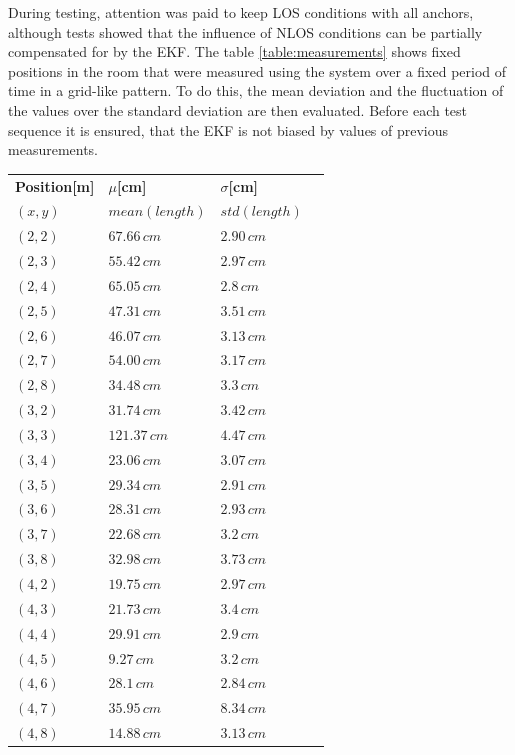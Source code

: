 \documentclass[conference, a4paper]{IEEEtran}
\begin{document}
During testing, attention was paid to keep \ac{LOS} conditions with all anchors,
although tests showed that the influence of \ac{NLOS} conditions can be partially compensated for by the \ac{EKF}.
The table \ref{table:measurements} shows fixed positions in the room that were measured using the system
over a fixed period of time in a grid-like pattern. 
To do this, the mean deviation and the fluctuation of the values over the standard deviation are then evaluated. 
Before each test sequence it is ensured, that the \ac{EKF} is not biased by values of previous measurements. 

\begin{table}[hbt!]
	\centering
	\begin{tabular}{l l l c}
		\textbf{Position[m]} & \textbf{$\mu$[cm]} & \textbf{$\sigma$[cm]}\\
		$(x,y)$ & $mean(length)$ & $std(length)$\\
		$(2,2)$ & $67.66\,cm$ & $2.90\,cm$\\
		$(2,3)$ & $55.42\,cm$ & $2.97\,cm$\\
		$(2,4)$ & $65.05\,cm$ & $2.8\,cm$\\
		$(2,5)$ & $47.31\,cm$ & $3.51\,cm$\\
		$(2,6)$ & $46.07\,cm$ & $3.13\,cm$\\
		$(2,7)$ & $54.00\,cm$ & $3.17\,cm$\\
		$(2,8)$ & $34.48\,cm$ & $3.3\,cm$\\
		
		$(3,2)$ & $31.74\,cm$ & $3.42\,cm$\\
		$(3,3)$ & $121.37\,cm$ & $4.47\,cm$\\
		$(3,4)$ & $23.06\,cm$ & $3.07\,cm$\\
		$(3,5)$ & $29.34\,cm$ & $2.91\,cm$\\
		$(3,6)$ & $28.31\,cm$ & $2.93\,cm$\\
		$(3,7)$ & $22.68\,cm$ & $3.2\,cm$\\
		$(3,8)$ & $32.98\,cm$ & $3.73\,cm$\\
		
		$(4,2)$ & $19.75\,cm$ & $2.97\,cm$\\
		$(4,3)$ & $21.73\,cm$ & $3.4\,cm$\\
		$(4,4)$ & $29.91\,cm$ & $2.9\,cm$\\
		$(4,5)$ & $9.27\,cm$ & $3.2\,cm$\\
		$(4,6)$ & $28.1\,cm$ & $2.84\,cm$\\
		$(4,7)$ & $35.95\,cm$ & $8.34\,cm$\\
		$(4,8)$ & $14.88\,cm$ & $3.13\,cm$\\
		

\end{tabular}
\end{table}
\end{document}
